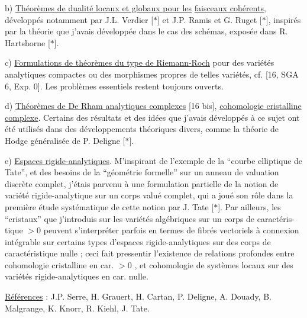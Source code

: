 
b) \uline{Théorèmes de dualité locaux et globaux pour les}
\uline{faisceaux cohérents}, développés notamment par
J.L. Verdier [$*$] et J.P. Ramis et G. Ruget [$*$], inspirés
par la théorie que j'avais développée dans le cas des
schémas, exposée dans R. Hartshorne [$*$].

c) \uline{Formulations de théorèmes du type de Riemann-Roch}
pour des variétés analytiques compactes ou des morphismes
propres de telles variétés, cf. [16, SGA 6, Exp. 0].
Les problèmes essentiels restent toujours ouverts.

d) \uline{Théorèmes de De Rham analytiques complexes} [16 bis],
\uline{cohomologie cristalline complexe}. Certains des résultats
et des idées que j'avais développés à ce sujet ont été
utilisés dans des développements théoriques divers, comme
la théorie de Hodge généralisée de P. Deligne [$*$].

e) \uline{Espaces rigide-analytiques}. M'inspirant de l'exemple
de la ``courbe elliptique de Tate'', et des besoins de
la ``géométrie formelle'' sur un anneau de valuation
discrète complet, j'étais parvenu à une formulation
partielle de la notion de variété rigide-analytique
sur un corps valué complet, qui a joué son rôle dans
la première étude systématique de cette notion par
J. Tate [$*$]. Par ailleurs, les ``cristaux'' que j'introduis
sur les variétés algébriques sur un corps de caractéris-%
tique $> 0$ peuvent s'interpréter parfois en termes de
fibrés vectoriels à connexion intégrable sur certains
types d'espaces rigide-analytiques sur des corps de
caractéristique nulle ; ceci fait pressentir l'existence
de relations profondes entre cohomologie cristalline
en car. $> 0$ , et cohomologie de systèmes locaux sur
des variétés rigide-analytiques en car. nulle.

\uline{Références} : J.P. Serre, H. Grauert, H. Cartan, P. Deligne,
A. Douady, B. Malgrange, K. Knorr, R. Kiehl,
J. Tate.

